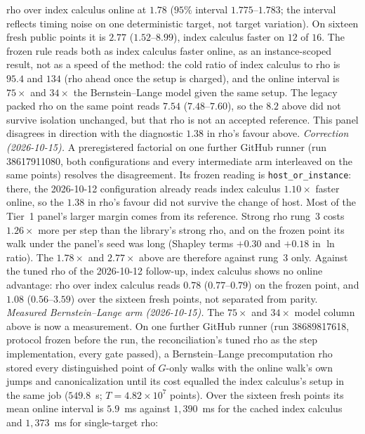 rho over index calculus online at $1.78$ ($95\%$ interval
$1.775$--$1.783$; the interval reflects timing noise on one deterministic
target, not target variation). On sixteen fresh public points it is $2.77$
($1.52$--$8.99$), index calculus faster on $12$ of $16$. The frozen rule
reads both as index calculus faster online, as an instance-scoped result,
not as a speed of the method: the cold ratio of index calculus to rho is
$95.4$ and $134$ (rho ahead once the setup is charged), and the online
interval is $75\times$ and $34\times$ the Bernstein--Lange model given the
same setup. The legacy packed rho on the same point reads $7.54$ ($7.48$--$7.60$),
so the $8.2$ above did not survive isolation unchanged, but that rho is not
an accepted reference. This panel disagrees in direction with the diagnostic
$1.38$ in rho's favour above.
\emph{Correction (2026-10-15).} A preregistered factorial on one further
GitHub runner (run 38617911080, both configurations and every intermediate
arm interleaved on the same points) resolves the disagreement. Its frozen
reading is \texttt{host\_or\_instance}: there, the 2026-10-12
configuration already reads index calculus $1.10\times$ faster online, so
the $1.38$ in rho's favour did not survive the change of host. Most of the
Tier~1 panel's larger margin comes from its reference. Strong rho rung~3
costs $1.26\times$ more per step than the library's strong rho, and on the
frozen point its walk under the panel's seed was long (Shapley terms $+0.30$
and $+0.18$ in $\ln$ ratio). The $1.78\times$ and $2.77\times$ above are
therefore against rung~3 only. Against the tuned rho of the 2026-10-12
follow-up, index calculus shows no online advantage: rho over index calculus
reads $0.78$ ($0.77$--$0.79$) on the frozen point, and $1.08$
($0.56$--$3.59$) over the sixteen fresh points, not separated from
parity.
\emph{Measured Bernstein--Lange arm (2026-10-15).} The $75\times$ and
$34\times$ model column above is now a measurement. On one further
GitHub runner (run 38689817618, protocol frozen before the run, the
reconciliation's tuned rho as the step implementation, every gate
passed), a Bernstein--Lange precomputation rho stored every
distinguished point of $G$-only walks with the online walk's own jumps
and canonicalization until its cost equalled the index calculus's setup
in the same job ($549.8$~s; $T=4.82\times10^7$ points). Over the sixteen
fresh points its mean online interval is $5.9$~ms against $1{,}390$~ms
for the cached index calculus and $1{,}373$~ms for single-target rho:
